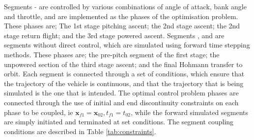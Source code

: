  Segments \textcolor{red}{-} are controlled by various combinations of angle of attack, bank angle and throttle, and are implemented as the phases of the optimisation problem. These phases are; The 1st stage pitching ascent; the 2nd stage ascent; the 2nd stage return flight; and the 3rd stage powered ascent.
 Segments \textcolor{red}{},\textcolor{red}{} and \textcolor{red}{} are segments without direct control, which are simulated using forward time stepping methods. 
 These phases are; the pre-pitch segment of the first stage; the unpowered section of the third stage ascent; and the final Hohmann transfer to orbit. 
 Each segment is connected through a set of conditions, which ensure that the trajectory of the vehicle is continuous, and that the trajectory that is being simulated is the one that is intended. 
  The optimal control problem phases are connected through the use of initial and end discontinuity constraints on each phase to be coupled, ie $\textbf{x}_{f1} = \textbf{x}_{02}, t_{f1} = t_{02}$, while the forward simulated segments are simply initiated and terminated at set conditions. 
 The segment coupling conditions are described in Table \ref{tab:constraints}.






